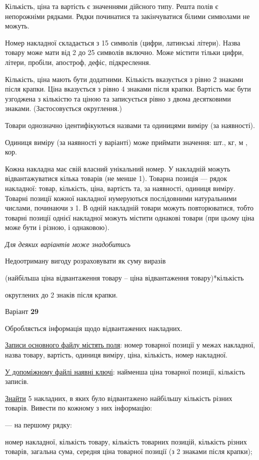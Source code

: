 \documentclass[11pt, ukrainian]{article}
\begin{document}
Кількість, ціна та вартість є значеннями дійсного типу.
Решта полів є непорожніми рядками.
Рядки починатися та закінчуватися білими символами не можуть.

Номер накладної складається з 15 символів (цифри, латинські літери).
Назва товару може мати від 2 до 25 символів включно.
Може містити тільки цифри, літери, пробіли, апостроф, дефіс, підкреслення.

Кількість, ціна мають бути додатними.
Кількість вказується з рівно 2 знаками після крапки.
Ціна вказується з рівно 4 знаками після крапки.
Вартість має бути узгоджена з кількістю та ціною та записується рівно з двома десятковими знаками.
(Застосовується округлення.)

Товари однозначно ідентифікуються назвами та одиницями виміру (за наявності).

Одиниця виміру (за наявності у варіанті) може приймати значення: шт., кг, м , кор.

Кожна накладна має свій власний унікальний номер.
У накладній можуть відвантажуватися кілька товарів (не менше 1).
Товарна позиція --- рядок накладної: товар, кількість, ціна, вартість та, за наявності, одиниця виміру.
Товарні позиції кожної накладної нумеруються послідовними натуральними числами, починаючи з 1.
В одній накладній товари можуть повторюватися, 
тобто товарні позиції однієї накладної можуть містити однакові товари 
(при цьому ціна може бути і різною, і однаковою).

\bigskip\textit{Для деяких варіантів може знадобитись}

Недоотриману вигоду розраховувати як суму виразів
{\center (найбільша ціна відвантаження товару – ціна відвантаження товару)*кількість\par}

\bigskip
{\noindent} округлених до 2 знаків після крапки.


\par
\newpage
{\center Варіант  \No \textbf { 29 }\par}
\bigskip
Обробляється інформація щодо відвантажених накладних.

\underline{Записи основного файлу містять поля}: номер товарної позиції у межах накладної, назва товару, вартість, одиниця виміру, ціна, кількість, номер накладної.

\underline{У допоміжному файлі наявні ключі}: найменша ціна товарної позиції, кількість записів.

\underline{Знайти} 5 накладних, в яких було відвантажено найбільшу кількість різних товарів. Вивести по кожному з них інформацію:\par
{\noindent}--- на першому рядку:\par
номер накладної, кількість товару, кількість товарних позицій, кількість різних товарів, загальна сума, середня ціна товарної позиції (з 2 знаками після крапки);
\end{document}

